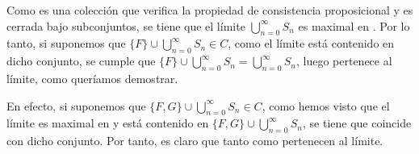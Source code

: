 \begin{isabellebody}
\begin{isamarkuptext}
  \begin{demostracion}
    Como  es una colección que verifica la propiedad de consistencia proposicional y es cerrada 
    bajo subconjuntos, se tiene que el límite $\bigcup_{n = 0}^{\infty} S_{n}$ es maximal en . Por 
    lo tanto, si suponemos que $\{F\} \cup \bigcup_{n = 0}^{\infty} S_{n} \in C$, como el límite 
    está contenido en dicho conjunto, se cumple que 
    $\{F\} \cup \bigcup_{n = 0}^{\infty} S_{n} = \bigcup_{n = 0}^{\infty} S_{n}$, luego  
    pertenece al límite, como queríamos demostrar.

    En efecto, si suponemos que $\{F,G\} \cup \bigcup_{n = 0}^{\infty} S_{n} \in C$, como hemos 
    visto que el límite es maximal en  y está contenido en 
    $\{F,G\} \cup \bigcup_{n = 0}^{\infty} S_{n}$, se tiene que coincide con dicho conjunto. Por 
    tanto, es claro que tanto  como  pertenecen al límite.
  \end{demostracion}


\end{isamarkuptext}
\end{isabellebody}
